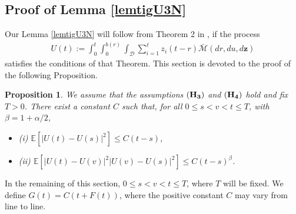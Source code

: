 \documentclass[11pt]{article}
\def\E{{\mathbb E}}
\def\D {\mathcal{D}}
\def\z {\mathbf{z}}
\newtheorem{lemma}[theorem]{Lemma}
\newtheorem{proposition}[theorem]{Proposition}
\newenvironment{proof}[1][Proof.]{\textbf{#1} }{\hfill $\blacksquare$}
\begin{document}
\subsection{Proof of Lemma \ref{lemtigU3N}} 
%

Our Lemma \ref{lemtigU3N} will follow from Theorem 2 in \cite{MH}, if the process
\begin{align*}
 U(t):=\int_0^t\int_0^{b(r)}\int_\D \sum_{i=1}^\ell z_i(t-r) \bar{\mathcal{M}}(dr,du,d\z)
\end{align*}
satisfies the conditions of that Theorem. This section is devoted to the proof of the following Proposition.
\begin{proposition}\label{HanCondi}
We assume that the assumptions ${(\bf H_3)}$ and ${(\bf H_4)}$ hold and fix $T>0$. There exist a constant $C$ such that, 
 for all $0\le s<v<t\le T$, with $\beta=1+\alpha/2$,
\begin{itemize}
\item{(i)} $\E[|U(t)-U(s)|^2]\le C(t-s)$,
\item{(ii)} $\E[|U(t)-U(v)|^2|U(v)-U(s)|^2]\le C(t-s)^\beta$.
\end{itemize}
\end{proposition}
In the remaining of this section, $0\le s<v<t\le T$, where $T$ will be fixed. We define $G(t)=C(t+F(t))$, where the positive constant $C$ may vary from line to line.
\end{document}
